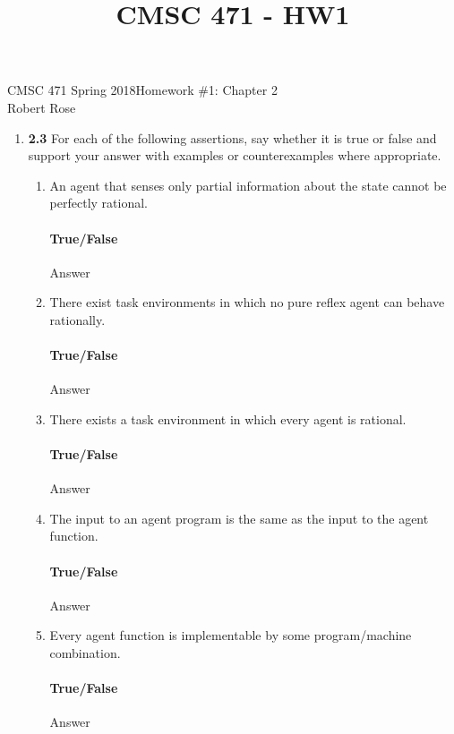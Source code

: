 \documentclass[12pt]{article}
\title{CMSC 471 - HW1}
\begin{document}
CMSC 471 Spring 2018\hfill Homework \#1: Chapter 2\\
Robert Rose

\hrulefill

\begin{enumerate}
\item \textbf{2.3} For each of the following assertions, say whether it is true or false and support
your answer with examples or counterexamples where appropriate.
  \begin{enumerate}
  \item An agent that senses only partial information about the state cannot be perfectly rational.\\
  \vspace{-2.5em}
  \paragraph{True/False} Answer

  \item There exist task environments in which no pure reflex agent can behave rationally.\\
  \vspace{-2.5em}
  \paragraph{True/False} Answer

  \item There exists a task environment in which every agent is rational.\\
  \vspace{-2.5em}
  \paragraph{True/False} Answer

  \item The input to an agent program is the same as the input to the agent function.\\
  \vspace{-2.5em}
  \paragraph{True/False} Answer

  \item Every agent function is implementable by some program/machine combination.\\
  \vspace{-2.5em}
  \paragraph{True/False} Answer


\end{enumerate}
\end{enumerate}
\end{document}
